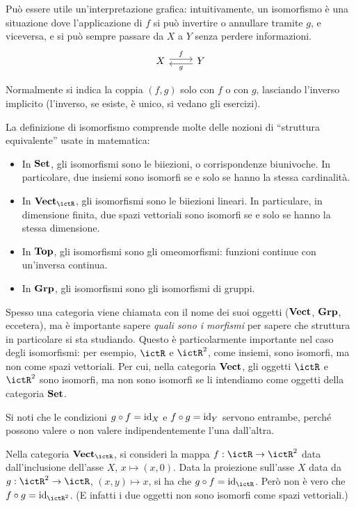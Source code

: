Può essere utile un'interpretazione grafica: intuitivamente, un isomorfismo è una situazione dove l'applicazione di $f$ si può invertire o annullare tramite $g$, e viceversa, e si può sempre passare da $X$ a $Y$ senza perdere informazioni. 
$$
\begin{tikzcd}
 X \ar[shift left]{r}{f} & Y \ar[shift left]{l}{g}
\end{tikzcd}
$$

Normalmente si indica la coppia $(f,g)$ solo con $f$ o con $g$, lasciando l'inverso implicito (l'inverso, se esiste, è unico, si vedano gli esercizi).

\begin{examples}
 La definizione di isomorfismo comprende molte delle nozioni di ``struttura equivalente'' usate in matematica:
 \begin{itemize}
  \item In $\mathbf{Set}$, gli isomorfismi sono le biiezioni, o corrispondenze biunivoche. In particolare, due insiemi sono isomorfi se e solo se hanno la stessa cardinalità.
  \item In $\ctVect_\ictR$, gli isomorfismi sono le biiezioni lineari. In particulare, in dimensione finita, due spazi vettoriali sono isomorfi se e solo se hanno la stessa dimensione.
  \item In $\mathbf{Top}$, gli isomorfismi sono gli omeomorfismi: funzioni continue con un'inversa continua. 
  \item In $\mathbf{Grp}$, gli isomorfismi sono gli isomorfismi di gruppi. 
 \end{itemize}
\end{examples}

\begin{warning}
 Spesso una categoria viene chiamata con il nome dei suoi oggetti ($\mathbf{Vect}$, $\mathbf{Grp}$, eccetera), ma è importante sapere \emph{quali sono i morfismi} per sapere che struttura in particolare si sta studiando. Questo è particolarmente importante nel caso degli isomorfismi: per esempio, $\ictR$ e $\ictR^2$, come insiemi, sono isomorfi, ma non come spazi vettoriali. Per cui, nella categoria $\mathbf{Vect}$, gli oggetti $\ictR$ e $\ictR^2$ sono isomorfi, ma non sono isomorfi se li intendiamo come oggetti della categoria $\mathbf{Set}$. 
\end{warning}

Si noti che le condizioni $g\circ f = \mathrm{id}_X$ e $f\circ g=\mathrm{id}_Y$ servono entrambe, perché possono valere o non valere indipendentemente l'una dall'altra. 
\begin{example}
 Nella categoria $\ctVect_\ictR$, si consideri la mappa $f:\ictR\to\ictR^2$ data dall'inclusione dell'asse $X$, $x\mapsto(x,0)$. Data la proiezione sull'asse $X$ data da $g:\ictR^2\to\ictR$, $(x,y)\mapsto x$, si ha che $g\circ f=\id_\ictR$. Però non è vero che $f\circ g = \id_{\ictR^2}$. (E infatti i due oggetti non sono isomorfi come spazi vettoriali.)
\end{example}

